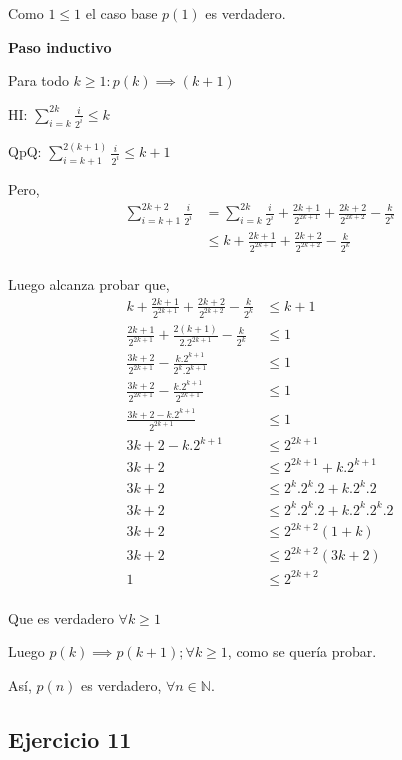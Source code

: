 Como $ 1 \leq 1 $ el caso base $p(1)$ es verdadero.

\textbf{Paso inductivo}

Para todo $k \geq 1: p(k) \implies (k+1)$

HI: $\sum_{i=k}^{2k}\frac{i}{2^i} \leq k$

QpQ: $ \sum_{i=k+1}^{2(k+1)}\frac{i}{2^i} \leq k+1$

Pero,
\begin{align*}
    \sum_{i=k+1}^{2k+2}\frac{i}{2^i} &= \sum_{i=k}^{2k}\frac{i}{2^i} + \frac{2k+1}{2^{2k+1}}+ \frac{2k+2}{2^{2k+2}} - \frac{k}{2^k} \\
    &\leq k + \frac{2k+1}{2^{2k+1}}+ \frac{2k+2}{2^{2k+2}} - \frac{k}{2^k} \\
\end{align*}

Luego alcanza probar que,
\begin{align*}
    k + \frac{2k+1}{2^{2k+1}}+ \frac{2k+2}{2^{2k+2}} - \frac{k}{2^k} &\leq k+1 \\
    \frac{2k+1}{2^{2k+1}}+ \frac{2(k+1)}{2.2^{2k+1}} - \frac{k}{2^k} &\leq 1 \\
    \frac{3k+2}{2^{2k+1}} - \frac{k.2^{k+1}}{2^k.2^{k+1}} &\leq 1 \\
    \frac{3k+2}{2^{2k+1}} - \frac{k.2^{k+1}}{2^{2k+1}} &\leq 1 \\
    \frac{3k+2 - k.2^{k+1}}{2^{2k+1}} &\leq 1 \\
    3k+2 - k.2^{k+1} &\leq 2^{2k+1} \\
    3k+2 &\leq 2^{2k+1} + k.2^{k+1}\\
    3k+2 &\leq 2^k.2^k.2 + k.2^k.2\\
    3k+2 &\leq 2^k.2^k.2 + k.2^k.2^k.2\\
    3k+2 &\leq 2^{2k+2}(1+k)\\
    3k+2 &\leq 2^{2k+2}(3k+2)\\
    1 &\leq 2^{2k+2}\\
\end{align*}

Que es verdadero $\forall k \geq 1$

Luego $p(k) \implies p(k+1); \forall k \geq 1$, como se quería probar.

Así, $p(n)$ es verdadero, $\forall n \in \mathbb{N}$.

\subsection{Ejercicio 11}

